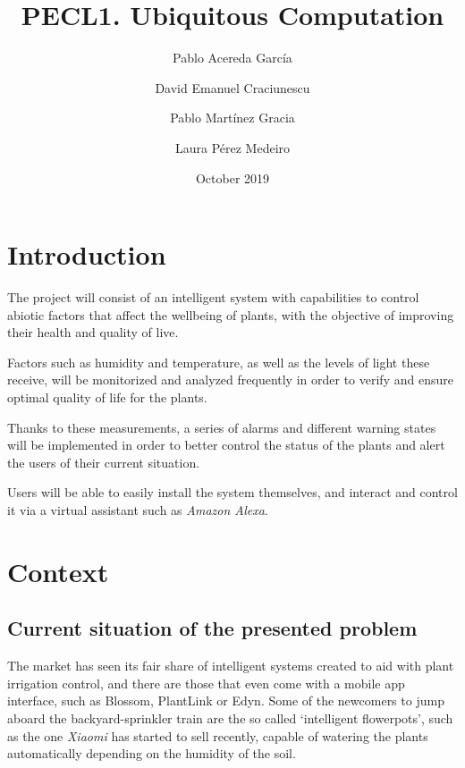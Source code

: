 \documentclass[runningheads]{llncs}
\title{PECL1. Ubiquitous Computation} %
\author{
    Pablo Acereda García \and 
    David Emanuel Craciunescu \and 
    Pablo Martínez Gracia \and 
    Laura Pérez Medeiro}
\date{October 2019}
\begin{document}
\maketitle


\section{Introduction}
The project will consist of an intelligent system with capabilities to control
abiotic factors that affect the wellbeing of plants, with the objective of
improving their health and quality of live.

Factors such as humidity and temperature, as well as the levels of light these
receive, will be monitorized and analyzed frequently in order to verify and 
ensure optimal quality of life for the plants.

Thanks to these measurements, a series of alarms and different warning states
will be implemented in order to better control the status of the plants and
alert the users of their current situation.

Users will be able to easily install the system themselves, and interact and
control it via a virtual assistant such as \textit{Amazon Alexa}.
    

\section{Context}


    \subsection{Current situation of the presented problem}

    The market has seen its fair share of intelligent systems created to aid
    with plant irrigation control, and there are those that even come with a
    mobile app interface, such as Blossom, PlantLink or Edyn. Some of the
    newcomers to jump aboard the backyard-sprinkler train are the so called 
    `intelligent flowerpots', such as the one \textit{Xiaomi} has started to 
    sell recently, capable of watering the plants automatically depending on the
    humidity of the soil.
\end{document}
